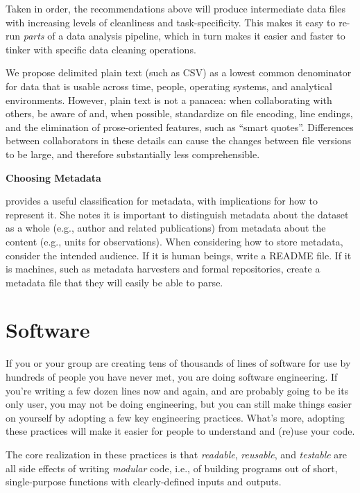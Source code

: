 \documentclass[10pt]{article}
\begin{document}
Taken in order, the recommendations above will
produce intermediate data files with increasing levels of cleanliness
and task-specificity. This makes it easy to re-run \emph{parts}
of a data analysis pipeline, which in turn makes it easier and faster
to tinker with specific data cleaning operations.

We propose delimited plain text (such as CSV) as a lowest common
denominator for data that is usable across time, people,
operating systems, and analytical environments. However,
plain text is not a panacea: when collaborating with
others, be aware of and, when possible, standardize on file encoding,
line endings, and the elimination of prose-oriented features, such as
``smart quotes''. Differences between collaborators in these
details can cause the changes between file versions to be large, and
therefore substantially less comprehensible.

\begin{framed}
\noindent \textbf{Choosing Metadata}

\cite{wickes2015} provides a useful classification for metadata, with implications for
how to represent it. She notes it is important to distinguish
metadata about the dataset as a whole (e.g., author and related publications)
from metadata about the content (e.g., units for observations).
When considering how to store metadata, consider the intended
audience. If it is human beings, write a README file. If it is machines, such as
metadata harvesters and formal repositories, create a metadata file
that they will easily be able to parse.
\end{framed}

\section{Software}\label{sec:software}

If you or your group are creating tens of thousands of lines of software
for use by hundreds of people you have never met,
you are doing software engineering. If you're writing a few dozen lines now
and again, and are probably going to be its only user, you may not be doing engineering,
but you can still
make things easier on yourself by adopting a few key engineering practices. What's
more, adopting these practices will make it easier for people to
understand and (re)use your code.

The core realization in these practices is that \emph{readable},
\emph{reusable}, and \emph{testable} are
all side effects of writing \emph{modular} code, i.e., of building programs out
of short, single-purpose functions with clearly-defined inputs and
outputs.
\end{document}
